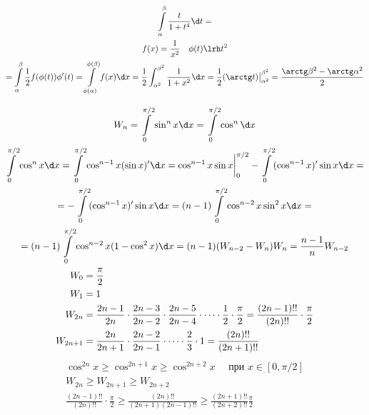 
\begin{exmp}
	\begin{gather*}
		\int\limits_\alpha^\beta \frac{t}{1+t^4} \d t = \\
		f(x) = \frac1{x^2} \quad \phi(t) \lrh t^2 \\
		= \int\limits_\alpha^\beta \frac12 f(\phi(t))\phi'(t) = \int\limits_{\phi(\alpha)}^{\phi(\beta)} f(x) \d x = \frac12 \int_{\alpha^2}^{\beta^2} \frac{1}{1+x^2} \d x = \frac12 (\arctg t)\bigr|_{\alpha^2}^{\beta^2} = \frac{\arctg \beta^2 - \arctg \alpha^2}2
	\end{gather*}
\end{exmp}

\begin{exmp}
	\begin{gather*}
		W_n = \int\limits_0^{\pi / 2} \sin^n x \d x = \int\limits_0^{\pi / 2} \cos^n \d x \\
		\int\limits^{\pi/2}_0 \cos^{n} x \d x = \int \limits_0^{\pi/2} \cos^{n - 1}x(\sin x)'\d x =
		\cos^{n - 1}x\sin x \biggr|_{0}^{\pi/2} - \int\limits_0^{\pi/2}(\cos^{n - 1}x)'\sin x \d x = \\
		= -\int\limits_0^{\pi/2}(\cos^{n - 1}x)'\sin x \d x = (n - 1)\int\limits_0^{\pi/2}\cos^{n - 2}x\sin^2x\d x = \\
		= (n - 1)\int\limits_0^{\pi/2}\cos^{n - 2}x(1 - \cos^2x)\d x = (n - 1)(W_{n - 2} - W_n)
		W_n = \frac{n - 1}{n}W_{n - 2} \\
		\begin{aligned}
			W_0 &= \frac\pi2 \\
			W_1 &= 1 \\
			W_{2n} &= \frac{2n - 1}{2n} \cdot \frac{2n - 3}{2n - 2} \cdot \frac{2n - 5}{2n - 4} \cdot \dots \cdot \frac{1}{2} \cdot \frac\pi2 = \frac{(2n - 1)!!}{(2n)!!} \cdot \frac\pi2 \\
			W_{2n + 1} &= \frac{2n}{2n + 1} \cdot \frac{2n - 2}{2n - 1} \cdot \dots \cdot \frac{2}{3} \cdot 1 = \frac{(2n)!!}{(2n + 1)!!}
		\end{aligned}
	\end{gather*}
	\begin{gather*}
		\cos^{2n} x \ge \cos^{2n + 1}x \ge \cos^{2n + 2}x \quad\text{ при $x\in[0, \pi/2]$} \\
		W_{2n} \ge W_{2n + 1} \ge W_{2n + 2} \\
		\frac{(2n - 1)!!}{(2n)!!}\cdot\frac\pi2 \ge \frac{(2n)!!}{(2n+1)(2n - 1)!!} \ge \frac{(2n + 1)!!}{(2n + 2)!!}\frac\pi2 \\

\end{gather*}
\end{exmp}
